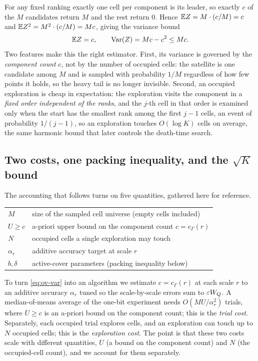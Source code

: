 For any fixed ranking exactly one cell per component is its leader, so exactly $c$ of the $M$ candidates
return $M$ and the rest return $0$. Hence $\mathbb{E} Z=M\cdot(c/M)=c$ and $\mathbb{E} Z^2=M^2\cdot(c/M)=Mc$, giving the
variance bound
\begin{equation}\label{eq:ov-var}
  \mathbb{E} Z=c,\qquad\operatorname{Var}(Z)=Mc-c^2\le Mc .
\end{equation}
Two features make this the right estimator. First, its variance is governed by the \emph{component count}
$c$, not by the number of occupied cells: the satellite is one candidate among $M$ and is sampled with
probability $1/M$ regardless of how few points it holds, so the heavy tail is no longer invisible.
Second, an occupied exploration is cheap in expectation: the exploration visits the component in a
\emph{fixed order independent of the ranks}, and the $j$-th cell in that order is examined only when the
start has the smallest rank among the first $j-1$ cells, an event of probability $1/(j-1)$, so an
exploration touches $O(\log K)$ cells on average, the same harmonic bound that later controls the
death-time search.

\subsection{Two costs, one packing inequality, and the \texorpdfstring{$\sqrt K$}{sqrt K} bound}
\label{sec:ov-twopart}

The accounting that follows turns on five quantities, gathered here for reference.
\begin{center}\small
\begin{tabular}{@{}ll@{}}
  $M$ & size of the sampled cell universe (empty cells included)\\
  $U\ge c$ & a-priori upper bound on the component count $c=c_\Gamma(r)$\\
  $N$ & occupied cells a single exploration may touch\\
  $\alpha_r$ & additive accuracy target at scale $r$\\
  $b,\delta$ & active-cover parameters (packing inequality below)\\
\end{tabular}
\end{center}
To turn \eqref{eq:ov-var} into an algorithm we estimate $c=c_\Gamma(r)$ at each scale $r$ to an additive
accuracy $\alpha_r$ tuned so the scale-by-scale errors sum to $\varepsilon W_Q$. A median-of-means average of the
one-bit experiment needs $O(MU/\alpha_r^2)$ trials, where $U\ge c$ is an a-priori bound on the component
count; this is the \emph{trial cost}. Separately, each occupied trial explores cells, and an exploration
can touch up to $N$ occupied cells; this is the \emph{exploration cost}. The point is that these two costs
scale with different quantities, $U$ (a bound on the component count) and $N$ (the occupied-cell count),
and we account for them separately.

